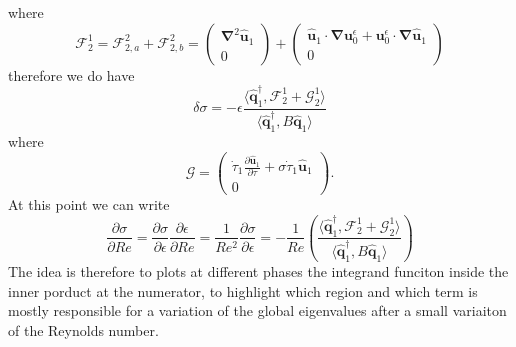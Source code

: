 %
where 
%
\begin{equation}
  \mathcal{F}_2^1 = \mathcal{F}_{2,a}^2 + \mathcal{F}_{2,b}^2 
  = \begin{pmatrix} \bm{\nabla}^2 \hat{\bm{u}}_1 \\ 0 \end{pmatrix} +
    \begin{pmatrix} \hat{\bm{u}}_1 \cdot \bm{\nabla} \bm{u}_0^\epsilon + \bm{u}_0^\epsilon \cdot \bm{\nabla} \hat{\bm{u}}_1 \\0 \end{pmatrix}
\end{equation}
%
therefore we do have
%
\begin{equation}
  \delta \sigma = - \epsilon \frac{ \langle \hat{\bm{q}}_1^\dagger, \mathcal{F}_2^1  + \mathcal{G}_2^1 \rangle }
                                  { \langle \hat{\bm{q}}_1^\dagger, B \hat{\bm{q}}_1 \rangle }
\end{equation}
%
where 
%
\begin{equation}
  \mathcal{G} = \begin{pmatrix} \dot{\tau}_1 \frac{\partial \hat{\bm{u}}_1}{\partial \tau} + \sigma \dot{\tau}_1 \hat{\bm{u}}_1 \\ 0 \end{pmatrix}.
\end{equation}
%
At this point we can write
%
\begin{equation}
  \frac{\partial \sigma}{\partial Re} = 
  \frac{\partial \sigma}{\partial \epsilon} \frac{\partial \epsilon}{\partial Re} = 
  \frac{1}{Re^2} \frac{\partial \sigma}{\partial \epsilon} = 
  - \frac{1}{Re} \left( \frac{ \langle \hat{\bm{q}}_1^\dagger, \mathcal{F}_2^1  + \mathcal{G}_2^1 \rangle }
                                  { \langle \hat{\bm{q}}_1^\dagger, B \hat{\bm{q}}_1 \rangle } \right)
\end{equation}
%
The idea is therefore to plots at different phases the integrand funciton inside the inner porduct at the numerator, to highlight which region and which term is mostly responsible for a variation of the global eigenvalues after a small variaiton of the Reynolds number.
